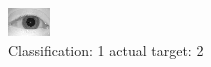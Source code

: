 \begin{figure}[h!]
\begin{center}
\includegraphics[width=0.60\columnwidth]{figures/ID909_class_1_target_2.png}
\end{center}
\caption{ Classification: 1 actual target: 2}
\label{fig:ID909_class_1_target_2}
\end{figure}
